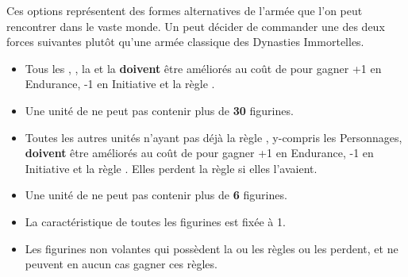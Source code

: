 \enditemlistonecol

\closearmyarmoury







\startarmynewsection{\monarchsofundead}

\spaceaftersection{}

\begin{center}
\noindent Ces options représentent des formes alternatives de l'armée que l'on peut rencontrer dans le vaste monde. Un \pharaoh{} peut décider de commander une des deux forces suivantes plutôt qu'une armée classique des Dynasties Immortelles.
\end{center}

\begin{multicols}{2}\raggedcolumns

\begin{center}\armynewsubsection{\commanderoftheterracottaarmy}\end{center} %

\begin{itemize}[label={-}, leftmargin=*]
\item Tous les \skeletons{}, \skeletonarchers{}, la \skeletoncavalry{} et la \necropolisguard{} \textbf{doivent} être améliorés au coût de \permodel{} pour gagner +1 en Endurance, -1 en Initiative et la règle \undeadconstruct{}.

\item Une unité de \necropolisguard{} ne peut pas contenir plus de \textbf{30} figurines.

\item Toutes les autres unités n'ayant pas déjà la règle \undeadconstruct{}, y-compris les Personnages, \textbf{doivent} être améliorés au coût de \permodel{} pour gagner +1 en Endurance, -1 en Initiative et la règle \undeadconstruct{}. Elles perdent la règle \flammable{} si elles l'avaient.

\item Une unité de \skeletonchariots{} ne peut pas contenir plus de \textbf{6} figurines.

\item La caractéristique \risen{} de toutes les figurines est fixée à 1.

\item Les figurines non volantes qui possèdent la ou les règles \undergroundambush{} ou \lighttroops{} les perdent, et ne peuvent en aucun cas gagner ces règles.


\end{itemize}
\end{multicols}
